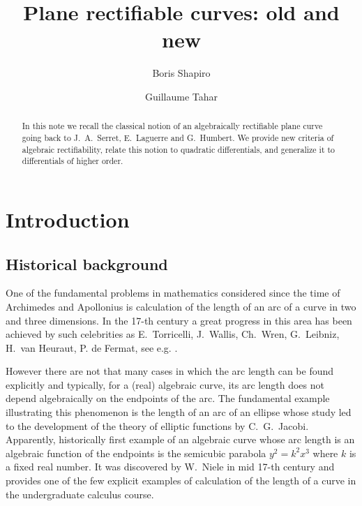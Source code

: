 \documentclass[reqno]{amsart}
\theoremstyle{definition}
\theoremstyle{remark}
\theoremstyle{definition}
\theoremstyle{definition}
\theoremstyle{definition}
\begin{document}

          \title[Plane rectifiable curves: old and new] %
          {Plane rectifiable curves: old and new} %

          \author[B.~Shapiro]{Boris Shapiro}
\address{Department of Mathematics, Stockholm University, SE-106 91, Stockholm,
            Sweden}

\author[G.~Tahar]{Guillaume Tahar}
\address{Beijing Institute of Mathematical Sciences and Applications, Huairou
District, Beijing, China}


\begin{abstract}
In this note we recall the classical notion of an algebraically rectifiable plane curve going back to J.~A.~Serret, E.~Laguerre and G.~Humbert. We provide new criteria of algebraic rectifiability, relate this notion to quadratic differentials, and generalize it to differentials of higher order.
\end{abstract}

\maketitle


\section{Introduction}
\subsection{Historical background}  
One of the fundamental problems in mathematics considered since the time of Archimedes and Apollonius is calculation of the length of an arc of a curve in two and three dimensions. In the 17-th century a  great progress in this area has been achieved  by such celebrities as E.~Torricelli, J.~Wallis, Ch.~Wren, G.~Leibniz, H.~van Heuraut, P. de Fermat, see e.g. \cite {Ka}.

 However there are not that many cases in which  the arc length can be found explicitly and typically, for a (real) algebraic curve, its arc length does not  depend algebraically on the endpoints of the arc. The fundamental example illustrating this phenomenon is  the  length of an arc of an ellipse whose study  led to the development of the theory of elliptic functions by C.~G.~Jacobi. %
  Apparently, historically first example of an algebraic curve whose arc length is an algebraic function of the endpoints is the semicubic parabola $y^2=k^2x^3$ where $k$ is a fixed real number.  It was discovered by W.~Niele in mid 17-th century and provides one of the few explicit examples of calculation of the length of a curve in the undergraduate calculus course.
\end{document}
